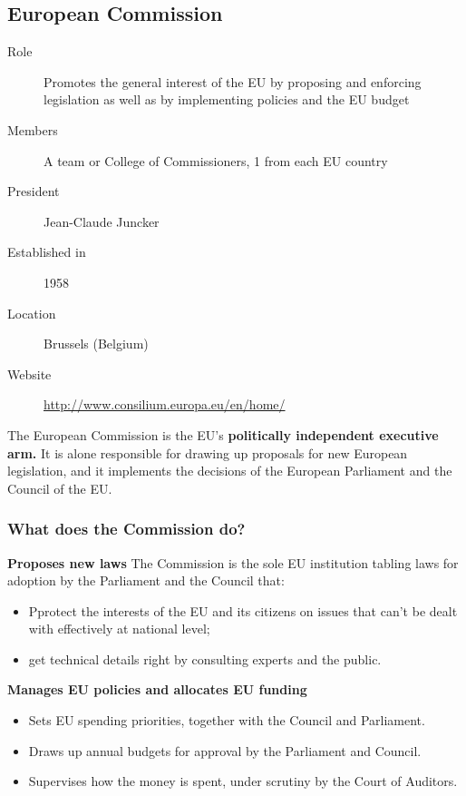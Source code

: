 \subsection{European Commission}
\begin{description}
	\item[Role] Promotes the general interest of the EU by proposing and enforcing legislation as well as by implementing policies and the EU budget
	\item[Members] A team or College of Commissioners, 1 from each EU country
	\item[President] Jean-Claude Juncker
	\item[Established in] 1958
	\item[Location] Brussels (Belgium)
	\item[Website] \href{http://www.consilium.europa.eu/en/home/}{http://www.consilium.europa.eu/en/home/}
\end{description}

The European Commission is the EU's \textbf{politically independent executive arm.} It is alone responsible for drawing up proposals for new European legislation, and it implements the decisions of the European Parliament and the Council of the EU.

\clearpage
\subsubsection{What does the Commission do?}

	\textbf{Proposes new laws}
	The Commission is the sole EU institution tabling laws for adoption by the Parliament and the Council that:
	\begin{itemize}
		\item Pprotect the interests of the EU and its citizens on issues that can't be dealt with effectively at national level;
		\item get technical details right by consulting experts and the public.
	\end{itemize}

	\textbf{Manages EU policies and allocates EU funding}
	\begin{itemize}
		\item Sets EU spending priorities, together with the Council and Parliament.
		\item Draws up annual budgets for approval by the Parliament and Council.
		\item Supervises how the money is spent, under scrutiny by the Court of Auditors.
	\end{itemize}

